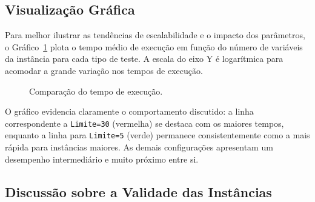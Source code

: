 \subsection{Visualização Gráfica}

Para melhor ilustrar as tendências de escalabilidade e o impacto dos parâmetros, o Gráfico~\ref{fig:grafico-resultados} plota o
tempo médio de execução em função do número de variáveis da instância para cada tipo de teste. A escala do eixo Y é logarítmica
para acomodar a grande variação nos tempos de execução.

\begin{figure}[ht!]
    \centering
    \caption{Comparação do tempo de execução.}
    \label{fig:grafico-resultados}
\end{figure}

O gráfico evidencia claramente o comportamento discutido: a linha correspondente a \texttt{Limite=30} (vermelha) se destaca com os maiores
tempos, enquanto a linha para \texttt{Limite=5} (verde) permanece consistentemente como a mais rápida para instâncias maiores. As demais configurações
apresentam um desempenho intermediário e muito próximo entre si.


\subsection{Discussão sobre a Validade das Instâncias}

